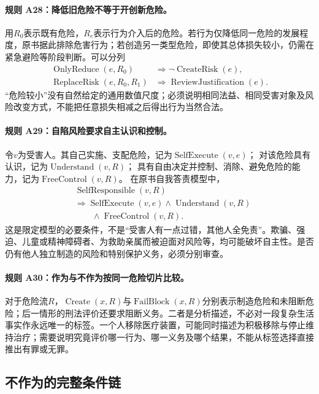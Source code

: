 \paragraph{规则 A28：降低旧危险不等于开创新危险。}
用$R_0$表示既有危险，$R_e$表示行为介入后的危险。若行为仅降低同一危险的发展程度，原书据此排除危害行为；若创造另一类型危险，即使其总体损失较小，仍需在紧急避险等阶段判断。可以分列
\[
\begin{aligned}
\operatorname{OnlyReduce}(e,R_0)&\Longrightarrow
\neg\operatorname{CreateRisk}(e),\\
\operatorname{ReplaceRisk}(e,R_0,R_1)&\Longrightarrow
\operatorname{ReviewJustification}(e).
\end{aligned}
\]
“危险较小”没有自然给定的通用数值尺度；必须说明相同法益、相同受害对象及风险改变方式，不能把任意损失相减之后得出行为当然合法。

\paragraph{规则 A29：自陷风险要求自主认识和控制。}
令$v$为受害人。其自己实施、支配危险，记为$\operatorname{SelfExecute}(v,e)$；
对该危险具有认识，记为$\operatorname{Understand}(v,R)$；
具有自由决定并控制、消除、避免危险的能力，记为$\operatorname{FreeControl}(v,R)$。
在原书自我答责模型中，
\[
\begin{aligned}
&\operatorname{SelfResponsible}(v,R)\\
&\Longrightarrow\operatorname{SelfExecute}(v,e)
\land\operatorname{Understand}(v,R)\\
&\qquad\land\operatorname{FreeControl}(v,R).
\end{aligned}
\]
这是限定模型的必要条件，不是“受害人有一点过错，其他人全免责”。欺骗、强迫、儿童或精神障碍者、为救助亲属而被迫面对风险等，均可能破坏自主性。是否仍有他人独立制造的风险和特别保护义务，必须分别审查。

\paragraph{规则 A30：作为与不作为按同一危险切片比较。}
对于危险流$R$，$\operatorname{Create}(x,R)$与$\operatorname{FailBlock}(x,R)$分别表示制造危险和未阻断危险；后一情形的刑法评价还要求阻断义务。二者是分析描述，不必对一段复杂生活事实作永远唯一的标签。一个人移除医疗装置，可能同时描述为积极移除与停止维持治疗；需要说明究竟评价哪一行为、哪一义务及哪个结果，不能从标签选择直接推出有罪或无罪。

\subsection{不作为的完整条件链}
